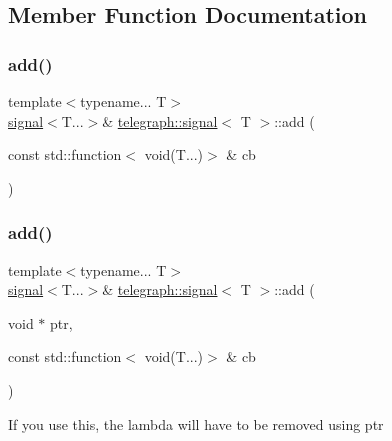 \subsection{Member Function Documentation}
\mbox{\label{classtelegraph_1_1signal_a849fca4479774ba132dd72d245bd50f1}} 
\subsubsection{\texorpdfstring{add()}{add()}\hspace{0.1cm}{\footnotesize\ttfamily [1/2]}}
{\footnotesize\ttfamily template$<$typename... T$>$ \\
\hyperlink{classtelegraph_1_1signal}{signal}$<$T...$>$\& \hyperlink{classtelegraph_1_1signal}{telegraph\+::signal}$<$ T $>$\+::add (\begin{DoxyParamCaption}\item[{const std\+::function$<$ void(T...)$>$ \&}]{cb }\end{DoxyParamCaption})\hspace{0.3cm}{\ttfamily [inline]}}

\mbox{\label{classtelegraph_1_1signal_aa1b6aaaccd54b00fb351677351084af3}} 
\subsubsection{\texorpdfstring{add()}{add()}\hspace{0.1cm}{\footnotesize\ttfamily [2/2]}}
{\footnotesize\ttfamily template$<$typename... T$>$ \\
\hyperlink{classtelegraph_1_1signal}{signal}$<$T...$>$\& \hyperlink{classtelegraph_1_1signal}{telegraph\+::signal}$<$ T $>$\+::add (\begin{DoxyParamCaption}\item[{void $\ast$}]{ptr,  }\item[{const std\+::function$<$ void(T...)$>$ \&}]{cb }\end{DoxyParamCaption})\hspace{0.3cm}{\ttfamily [inline]}}

If you use this, the lambda will have to be removed using ptr \mbox{\label{classtelegraph_1_1signal_a15ea24d911416785a6e40a14efcf67ce}} 
